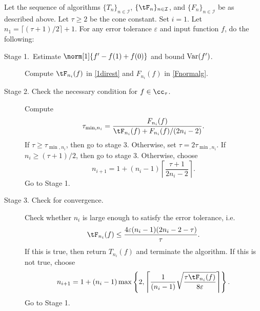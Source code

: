\begin{algo} \label{multistageintegalgo}
Let the sequence of algorithms $\{T_n\}_{n\in \mathcal{I}}$, $\{\tF_n\}_{n\in \mathcal{I}}$, and $\{F_n\}_{n\in \mathcal{I}}$ be as described above.
Let $\tau\ge2$ be the cone constant. Set $i=1$. Let $n_1=\lceil(\tau+1)/2\rceil+1$. For any error tolerance $\varepsilon$ and input function $f$, do the following:
\begin{description}
\item[Stage 1.\ Estimate {$\norm[1]{f'-f(1)+f(0)}$} and bound {$\operatorname{Var}(f')$}.] Compute $\tF_{n_i}(f)$ in \eqref{1direst} and $F_{n_i}(f)$ in \eqref{Fnormalg}.

\item[Stage 2. Check the necessary condition for $f \in \cc_{\tau}$.] Compute
    \begin{align*}
     \tau_{\min,n_i} =  \frac{F_{n_i}(f)}{\tF_{n_i}(f)+F_{n_i}(f)/(2n_i-2)}.
    \end{align*}
If $\tau \ge \tau_{\min,n_i}$, then go to stage 3.  Otherwise, set $\tau = 2\tau_{\min,n_i}$.  If $n_i \ge (\tau+1)/2$, then go to stage 3.  Otherwise, choose
$$
n_{i+1}=1+ (n_i-1)\left\lceil\frac{\tau+1}{2n_i-2}\right\rceil.
$$
Go to Stage 1.

\item[Stage 3. Check for convergence.] Check whether $n_i$ is large enough to satisfy the error tolerance, i.e.
    \begin{equation*}
     \tF_{n_i}(f) \le \frac{4\varepsilon(n_i-1)(2n_i-2 - \tau)}{\tau}.
    \end{equation*}
If this is true, then return $T_{n_i}(f)$ and terminate the algorithm.   If this is not true, choose
$$
n_{i+1}=1+ (n_i-1)\max\left\{2,\left\lceil\frac{1}{(n_i-1)}\sqrt{\frac{\tau \tF_{n_i}(f)}{8\varepsilon}}\right\rceil\right\}.
$$
Go to Stage 1.
\end{description}
\end{algo}


